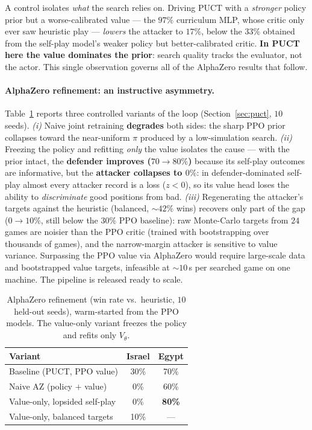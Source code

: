 \documentclass{article}
\begin{document}
A control isolates \emph{what} the search relies on. Driving PUCT with a \emph{stronger}
policy prior but a worse-calibrated value --- the $97\%$ curriculum MLP, whose critic only
ever saw heuristic play --- \emph{lowers} the attacker to $17\%$, below the $33\%$ obtained
from the self-play model's weaker policy but better-calibrated critic. \textbf{In PUCT here
the value dominates the prior}: search quality tracks the evaluator, not the actor. This
single observation governs all of the AlphaZero results that follow.

\paragraph{AlphaZero refinement: an instructive asymmetry.}
Table~\ref{tab:az} reports three controlled variants of the loop (Section~\ref{sec:puct},
$10$ seeds). \emph{(i)} Naive joint retraining \textbf{degrades} both sides: the sharp PPO
prior collapses toward the near-uniform $\pi$ produced by a low-simulation search.
\emph{(ii)} Freezing the policy and refitting \emph{only} the value isolates the cause ---
with the prior intact, the \textbf{defender improves ($70\!\to\!80\%$)} because its
self-play outcomes are informative, but the \textbf{attacker collapses to $0\%$}: in
defender-dominated self-play almost every attacker record is a loss ($z<0$), so its value
head loses the ability to \emph{discriminate} good positions from bad. \emph{(iii)}
Regenerating the attacker's targets against the heuristic (balanced, $\sim$$42\%$ wins)
recovers only part of the gap ($0\!\to\!10\%$, still below the $30\%$ PPO baseline): raw
Monte-Carlo targets from $24$ games are noisier than the PPO critic (trained with
bootstrapping over thousands of games), and the narrow-margin attacker is sensitive to
value variance. Surpassing the PPO value via AlphaZero would require large-scale data and
bootstrapped value targets, infeasible at $\sim$$10$\,s per searched game on one machine.
The pipeline is released ready to scale.

\begin{table}[t]
\centering
\caption{AlphaZero refinement (win rate vs.\ heuristic, $10$ held-out seeds), warm-started
from the PPO models. The value-only variant freezes the policy and refits only $V_\theta$.}
\label{tab:az}
\begin{tabular}{lcc}
\toprule
\textbf{Variant} & \textbf{Israel} & \textbf{Egypt} \\
\midrule
Baseline (PUCT, PPO value)        & 30\% & 70\% \\
Naive AZ (policy $+$ value)       & 0\%  & 60\% \\
Value-only, lopsided self-play    & 0\%  & \textbf{80\%} \\
Value-only, balanced targets      & 10\% & --- \\
\bottomrule
\end{tabular}
\end{table}
\end{document}
